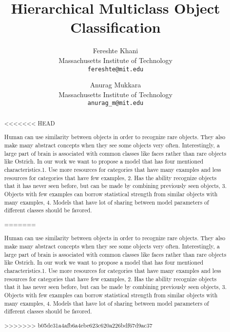 \documentclass[10pt,twocolumn,letterpaper]{article}
\begin{document}
\title{Hierarchical Multiclass Object Classification }

\author{Fereshte Khani\\ 
Massachusetts Institute of Technology\\
{\tt\small fereshte@mit.edu}
\and
Anurag Mukkara\\
Massachusetts Institute of Technology\\
{\tt\small anurag\_m@mit.edu}
}

\maketitle

\begin{abstract}
<<<<<<< HEAD
	
	Human can use similarity between objects in order to recognize rare objects. They also make many abstract concepts when they see some objects very often. Interestingly, a large part of brain is associated with common classes like faces rather than rare objects like Ostrich.
	In our work we want to propose a model that has four mentioned characteristics.1. Use more resources for categories that have many examples and less resources for categories that have few examples, 2. Has the ability recognize objects that it has never seen before, but can be made by combining previously seen objects, 3. Objects with few examples can borrow statistical strength from similar objects with many examples, 4. Models that have lot of sharing between model parameters of different classes should be favored.
	
=======

Human can use similarity between objects in order to recognize rare objects. They also make many abstract concepts when they see some objects very often. Interestingly, a large part of brain is associated with common classes like faces rather than rare objects like Ostrich.
In our work we want to propose a model that has four mentioned characteristics.1. Use more resources for categories that have many examples and less resources for categories that have few examples, 2. Has the ability recognize objects that it has never seen before, but can be made by combining previously seen objects, 3. Objects with few examples can borrow statistical strength from similar objects with many examples, 4. Models that have lot of sharing between model parameters of different classes should be favored.

>>>>>>> b05de31a4afb6a4ebe623c620a226bdf67d9ac37
\end{abstract}
\end{document}

